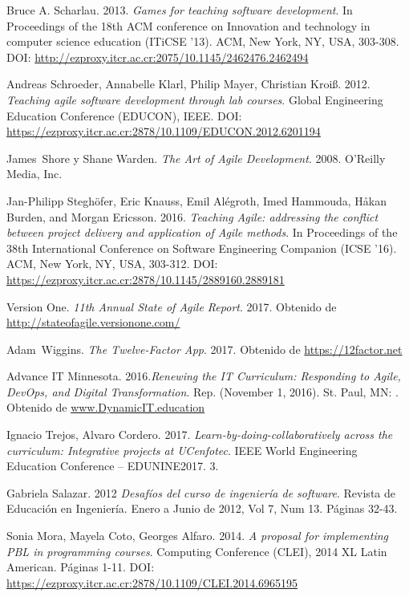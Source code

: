\documentclass[journal]{IEEEtran}
\begin{document}
\begin{thebibliography}{1}
Bruce A. Scharlau. 2013. \emph{Games for teaching software development}. In Proceedings of the 18th ACM conference on Innovation and technology in computer science education (ITiCSE '13). ACM, New York, NY, USA, 303-308. DOI: \url{http://ezproxy.itcr.ac.cr:2075/10.1145/2462476.2462494}

Andreas Schroeder, Annabelle Klarl, Philip Mayer, Christian Kroiß. 2012. \emph{Teaching agile software development through lab courses}. Global Engineering Education Conference (EDUCON), IEEE. DOI: \url{https://ezproxy.itcr.ac.cr:2878/10.1109/EDUCON.2012.6201194}

James~Shore y Shane Warden. \emph{The Art of Agile Development}. 2008. O'Reilly Media, Inc.

Jan-Philipp Steghöfer, Eric Knauss, Emil Alégroth, Imed Hammouda, Håkan Burden, and Morgan Ericsson. 2016. \emph{Teaching Agile: addressing the conflict between project delivery and application of Agile methods}. In Proceedings of the 38th International Conference on Software Engineering Companion (ICSE '16). ACM, New York, NY, USA, 303-312. DOI: \url{https://ezproxy.itcr.ac.cr:2878/10.1145/2889160.2889181}

Version One. \emph{11th Annual State of Agile Report}. 2017. Obtenido de \url{http://stateofagile.versionone.com/}

Adam~Wiggins. \emph{The Twelve-Factor App}. 2017. Obtenido de \url{https://12factor.net}

Advance IT Minnesota.  2016.\emph{Renewing the IT Curriculum: Responding to Agile, DevOps, and Digital Transformation}. Rep. (November 1, 2016). St. Paul, MN: . Obtenido de \url{www.DynamicIT.education}

Ignacio Trejos, Alvaro Cordero. 2017. \emph{Learn-by-doing-collaboratively across the curriculum: Integrative projects at UCenfotec}. IEEE World Engineering Education Conference – EDUNINE2017. 3. 

Gabriela Salazar. 2012 \emph{Desafíos del curso de ingeniería de software}. Revista de Educación en Ingeniería. Enero a Junio de 2012, Vol 7, Num 13. Páginas 32-43. 

Sonia Mora, Mayela Coto, Georges Alfaro. 2014. \emph{A proposal for implementing PBL in programming courses}. Computing Conference (CLEI), 2014 XL Latin American. Páginas 1-11. DOI: \url{https://ezproxy.itcr.ac.cr:2878/10.1109/CLEI.2014.6965195}


\end{thebibliography}
\end{document}
